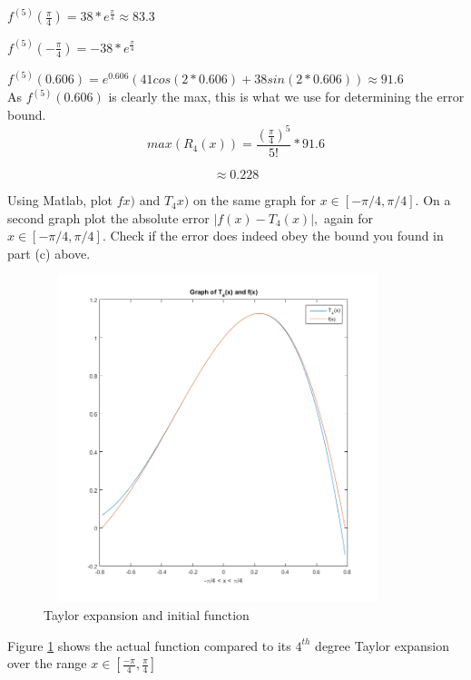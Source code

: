 	$f^{(5)}(\frac{\pi}{4}) = 38*e^{\frac{\pi}{4}} \approx 83.3$

	$f^{(5)}(-\frac{\pi}{4}) = -38*e^{\frac{\pi}{4}}$

	$f^{(5)}(0.606) = e^{0.606}(41cos(2*0.606)+38sin(2*0.606)) \approx 91.6$ \\

	As $f^{(5)}(0.606)$ is clearly the max, this is what we use for determining the error bound. \\

	$$max(R_4(x)) = \frac{(\frac{\pi}{4})^5}{5!}*91.6$$

	$$\approx 0.228$$

\item Using Matlab, plot $fx)$ and $T_4x)$ on the same graph for $x \in [-\pi/4,\pi/4].$
On a second graph plot the absolute error $|f(x)-T_4(x)|,$ again for $x \in [-\pi/4,\pi/4].$  Check if the error does indeed obey the bound you found in part (c) above. \\

\begin{figure}[h!]
	\centering
	\includegraphics[width=4in, height=3.75in]{tf.png}
	\caption{Taylor expansion and initial function}
	\label{fig:graph1}
\end{figure}

Figure \ref{fig:graph1} shows the actual function compared to its $4^{th}$ degree Taylor expansion over the range
$x \in [\frac{-\pi}{4} , \frac{\pi}{4} ]$ \\

